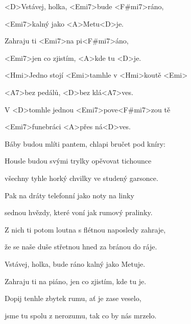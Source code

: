 

\zs
<D>Vstávej, holka, <Emi7>bude <F#mi7>ráno,

<Emi7>kalný jako <A>Metu<D>je.

Zahraju ti <Emi7>na pi<F#mi7>áno,

<Emi7>jen co zjistím, <A>kde tu <D>je.

<Hmi>Jedno stojí <Emi>tamhle v <Hmi>koutě <Emi>

<A7>bez pedálů, <D>bez klá<A7>ves.

V <D>tomhle jednou <Emi7>pove<F#mi7>zou tě

<Emi7>funebráci <A>přes ná<D>ves.
\ks

\zs
Báby budou mlíti pantem, chlapi bručet pod kníry:


Housle budou svými trylky opěvovat tichounce

všechny tyhle horký chvilky ve studený garsonce.
\ks

\zs
Pak na dráty telefonní jako noty na linky

sednou hvězdy, které voní jak rumový pralinky.

Z nich ti potom loutna s flétnou naposledy zahraje,

že se naše duše střetnou hned za bránou do ráje.
\ks

\zs
Vstávej, holka, bude ráno kalný jako Metuje.

Zahraju ti na piáno, jen co zjistím, kde tu je.

Dopij tenhle zbytek rumu, ať je zase veselo,

jsme tu spolu z nerozumu, tak co by nás mrzelo. 
\ks

\kp
